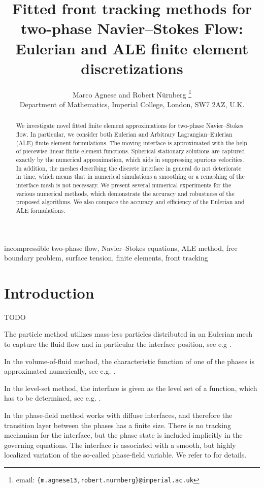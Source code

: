 \documentclass[a4paper,12pt,onecolumn]{article}
\title{Fitted front tracking methods for two-phase Navier--Stokes Flow:
Eulerian and ALE finite element discretizations
}
\author{Marco Agnese and Robert N\"urnberg%
\thanks{email: \texttt{\{m.agnese13,robert.nurnberg\}@imperial.ac.uk}}\\
\small
Department of Mathematics, Imperial College, London, SW7 2AZ, U.K.}
\date{}
\newenvironment{keywords}{{\upshape\bfseries Key words. }\ignorespaces}{}
\begin{document}
\captionsetup[subfigure]{labelformat=empty} %

\maketitle

\begin{abstract}
We investigate novel fitted finite element approximations for two-phase
Navier--Stokes flow. In particular, we consider both Eulerian and
Arbitrary Lagrangian--Eulerian (ALE) finite element formulations.
The moving interface is approximated with the help of piecewise linear
finite element functions.
Spherical stationary solutions are captured exactly by the numerical
approximation, which aids in suppressing spurious velocities.
In addition, the meshes describing the discrete interface in
general do not deteriorate in time, which means that in numerical simulations a
smoothing or a remeshing of the interface mesh is not necessary.
We present several numerical experiments for the various numerical methods,
which demonstrate the accuracy and robustness of the proposed algorithms.
We also compare the accuracy and efficiency of the Eulerian and ALE
formulations.
\end{abstract}

\begin{keywords}
incompressible two-phase flow, Navier--Stokes equations, ALE method,
free boundary problem, surface tension, finite elements, front tracking
\end{keywords}

\section{Introduction}\label{sec:introdution}
TODO

The particle method utilizes mass-less particles distributed in an Eulerian
mesh to capture the fluid flow and in particular the interface position, see
e.g \cite{Girault1976}.

In the volume-of-fluid method, the characteristic function of one of the phases
is approximated numerically, see e.g. \cite{HirtN81,RenardyR02,Popinet09}.

In the level-set method, the interface is given as the level set of a function,
which has to be determined, see e.g.
\cite{SussmanSO94,Sethian99,OsherF03,GrossR07,Svacek17}.

In the phase-field method works with diffuse interfaces, and therefore the
transition layer between the phases has a finite size. There is no tracking
mechanism for the interface, but the phase state is included implicitly in the
governing equations. The interface is associated with a smooth, but highly
localized variation of the so-called phase-field variable. We refer to
\cite{HohenbergH77,AndersonMW98,LowengrubT98,Feng06,KaySW08,AbelsGG12,GrunK14}
for details.
\end{document}
